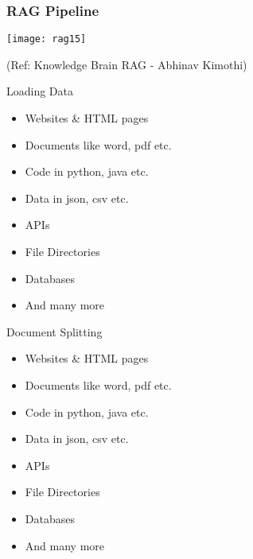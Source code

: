 \begin{frame}[fragile]\frametitle{RAG Pipeline}

	\begin{center}
	\texttt{[image: rag15]}
	\end{center}

	{\tiny (Ref: Knowledge Brain RAG - Abhinav  Kimothi)}

\end{frame}




\begin{frame}[fragile]{Loading Data}
    \begin{itemize}
        \item Websites \& HTML pages
        \item Documents like word, pdf etc.
        \item Code in python, java etc.
        \item Data in json, csv etc.
        \item APIs
        \item File Directories
        \item Databases
        \item And many more
    \end{itemize}
\end{frame}

\begin{frame}[fragile]{Document Splitting}
    \begin{itemize}
        \item Websites \& HTML pages
        \item Documents like word, pdf etc.
        \item Code in python, java etc.
        \item Data in json, csv etc.
        \item APIs
        \item File Directories
        \item Databases
        \item And many more
    \end{itemize}
\end{frame}


